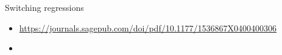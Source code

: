 \begin{itemize}
				
				
				
				
				
				
				
		\end{itemize}

Switching regressions

\begin{itemize}
	\item \url{https://journals.sagepub.com/doi/pdf/10.1177/1536867X0400400306}
	\item 	
\end{itemize}



